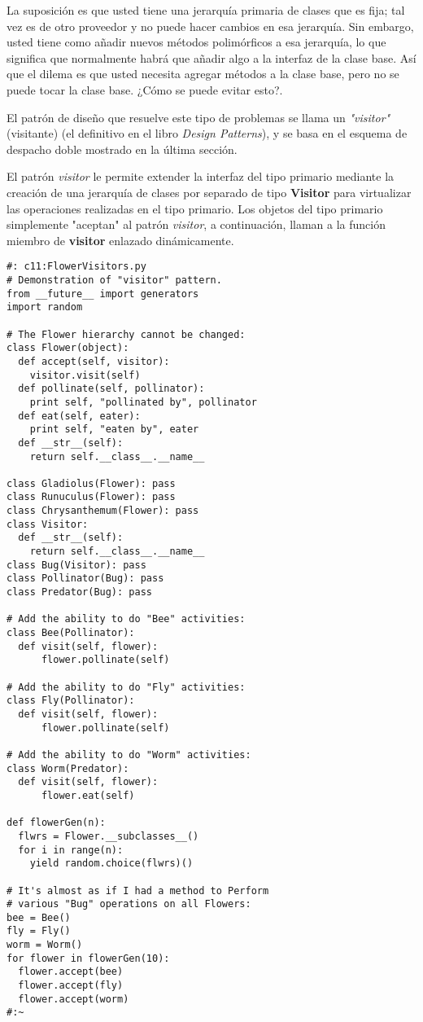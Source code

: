 La suposición es que usted tiene una jerarquía primaria de clases que es fija; tal vez es de otro proveedor y no puede hacer cambios en esa jerarquía. Sin embargo, usted tiene como añadir nuevos métodos polimórficos a esa jerarquía, lo que significa que normalmente habrá que añadir algo a la interfaz de la clase base. Así que el dilema es que usted necesita agregar métodos a la clase base, pero no se puede tocar la clase base. ¿Cómo se puede evitar esto?.     \newline

El patrón de diseño que resuelve este tipo de problemas se llama un \textit{"visitor"} (visitante) (el definitivo en el libro \textit{Design Patterns}), y se basa en el esquema de despacho doble mostrado en la última sección.    \newline

El patrón \textit{visitor} le permite extender la interfaz del tipo primario mediante la creación de una jerarquía de clases por separado de tipo \textbf{Visitor} para virtualizar las operaciones realizadas en el tipo primario. Los objetos del tipo primario simplemente "aceptan" al patrón \textit{visitor}, a continuación, llaman a la función miembro de \textbf{visitor} enlazado dinámicamente.   \newline

\begin{lstlisting} 
#: c11:FlowerVisitors.py 
# Demonstration of "visitor" pattern. 
from __future__ import generators 
import random 

# The Flower hierarchy cannot be changed: 
class Flower(object):   
  def accept(self, visitor): 
    visitor.visit(self) 
  def pollinate(self, pollinator): 
    print self, "pollinated by", pollinator 
  def eat(self, eater): 
    print self, "eaten by", eater 
  def __str__(self):  
    return self.__class__.__name__
    
class Gladiolus(Flower): pass 
class Runuculus(Flower): pass 
class Chrysanthemum(Flower): pass  
class Visitor: 
  def __str__(self):  
    return self.__class__.__name__ 
class Bug(Visitor): pass 
class Pollinator(Bug): pass 
class Predator(Bug): pass 

# Add the ability to do "Bee" activities: 
class Bee(Pollinator): 
  def visit(self, flower): 
      flower.pollinate(self) 
      
# Add the ability to do "Fly" activities: 
class Fly(Pollinator): 
  def visit(self, flower): 
      flower.pollinate(self) 
      
# Add the ability to do "Worm" activities: 
class Worm(Predator): 
  def visit(self, flower): 
      flower.eat(self) 
      
def flowerGen(n): 
  flwrs = Flower.__subclasses__() 
  for i in range(n): 
    yield random.choice(flwrs)() 
    
# It's almost as if I had a method to Perform 
# various "Bug" operations on all Flowers: 
bee = Bee() 
fly = Fly() 
worm = Worm() 
for flower in flowerGen(10): 
  flower.accept(bee) 
  flower.accept(fly) 
  flower.accept(worm) 
#:~ 
\end{lstlisting}



